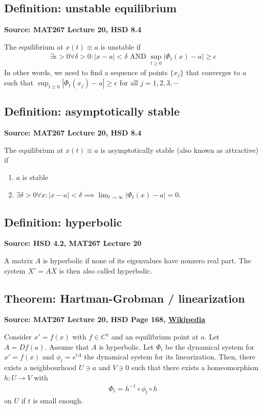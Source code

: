 \documentclass[11pt]{article}
\begin{document}
\subsection{Definition: unstable equilibrium}
\textbf{Source: MAT267 Lecture 20, HSD 8.4}

The equilibrium at $x(t) \equiv a$ is unstable if 
\begin{align*}
    \exists \epsilon > 0 \forall \delta > 0 : |x - a| < \delta \text{ AND } \sup_{t \geq 0} |\Phi_t(x) - a| \geq \epsilon 
\end{align*}In other words, we need to find a sequence of points $\{ x_j\}$ that converges to $a$ such that $\sup_{t \geq 0} |\Phi_t(x_j) - a| \geq \epsilon$ for all $j = 1,2,3, \cdots$


\subsection{Definition: asymptotically stable}
\textbf{Source: MAT267 Lecture 20, HSD 8.4}

The equilibrium at $x(t) \equiv a$ is asymptotically stable (also known as attractive) if 
\begin{enumerate}
    \item $a$ is stable 
    \item $\exists \delta > 0 \forall x : |x-a| < \delta \implies \lim_{t \to \infty} |\Phi_t(x) - a| = 0$. 
\end{enumerate}

\subsection{Definition: hyperbolic}
\textbf{Source: HSD 4.2, MAT267 Lecture 20}

A matrix $A$ is hyperbolic if none of its eigenvalues have nonzero real part. The system $X' = AX$ is then also called hyperbolic. 

\subsection{Theorem: Hartman-Grobman / linearization}
\textbf{Source: MAT267 Lecture 20, HSD Page 168, \href{https://en.wikipedia.org/wiki/Hartman\%E2\%80\%93Grobman_theorem\#:~:text=In\%20mathematics\%2C\%20in\%20the\%20study,of\%20a\%20hyperbolic\%20equilibrium\%20point.}{Wikipedia}}

Consider $x' = f(x)$ with $f \in C^1 $ and an equilibrium point at $a$. Let $A = Df(a)$. Assume that $A$ is hyperbolic. Let $\Phi_t$ be the dynamical system for $x' = f(x)$ and $\phi_t = e^{tA}$ the dynamical system for its linearization. Then, there exists a neighbourhood $U \ni a$ and $V \ni 0$ such that there exists a homeomorphism $h: U \to V$ with 
\begin{align*}
    \Phi_t = h^{-1} \circ \phi_t \circ h
\end{align*}
on $U$ if $t$ is small enough. 
\end{document}
